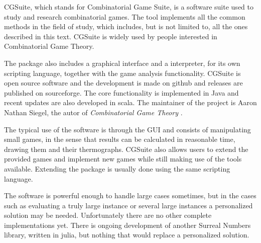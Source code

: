 CGSuite, which stands for Combinatorial Game Suite, is a software suite used to study and research combinatorial games. The tool implements all the common methods in the field of study, which includes, but is not limited to, all the ones described in this text. CGSuite is widely used by people interested in Combinatorial Game Theory.

The package also includes a graphical interface and a interpreter, for its own scripting language, together with the game analysis functionality. CGSuite is open source software and the development is made on github and releases are published on sourceforge. The core functionality is implemented in Java and recent updates are also developed in scala. The maintainer of the project is Aaron Nathan Siegel, the autor of \textit{Combinatorial Game Theory} \cite{CGT}.

The typical use of the software is through the GUI and consists of manipulating small games, in the sense that results can be calculated in reasonable time, drawing them and their thermographs. CGSuite also allows users to extend the provided games and implement new games while still making use of the tools available. Extending the package is usually done using the same scripting language. 

The software is powerful enough to handle large cases sometimes, but in the cases such as evaluating a truly large instance or several large instances a personalized solution may be needed. Unfortunately there are no other complete implementations yet. There is ongoing development of another Surreal Numbers library, written in julia, but nothing that would replace a personalized solution.







